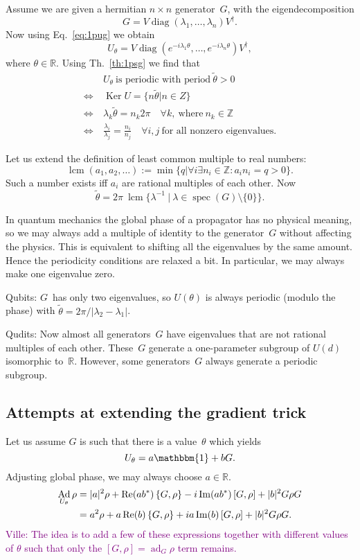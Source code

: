 \documentclass[aps,pra,10pt,twocolumn,groupedaddress,nofootinbib]{revtex4-1}
\theoremstyle{plain}
\DeclareMathOperator{\re}{Re}
\DeclareMathOperator{\im}{Im}
\DeclareMathOperator{\Ad}{Ad}
\DeclareMathOperator{\ad}{ad}
\DeclareMathOperator{\diag}{diag}  %
\DeclareMathOperator{\Ker}{Ker}    %
\DeclareMathOperator{\spec}{spec}  %
\DeclareMathOperator{\lcm}{lcm}    %
\newcommand{\be}{\begin{equation}}
\newcommand{\ee}{\end{equation}}
\newcommand{\Z}{\ensuremath{\mathbb Z}}  %
\newcommand{\R}{\ensuremath{\mathbb R}}  %
\newcommand{\I}{\mathbbm{1}} %
\newcommand{\comm}[2]{\ensuremath{\left[#1, #2\right]}}             %
\newcommand{\acomm}[2]{\ensuremath{\left\{#1, #2\right\}}}          %
\newcommand{\ville}[1]{\textcolor{purple}{Ville: #1}}
\begin{document}
Assume we are given a hermitian $n \times n$ generator~$G$, with the eigendecomposition
\be
G = V \diag(\lambda_1, \ldots, \lambda_n) V^\dagger.
\ee
Now using Eq.~\eqref{eq:1pug} we obtain
\be
U_\theta
= V \diag(e^{-i\lambda_1 \theta}, \ldots, e^{-i\lambda_n \theta}) V^\dagger,
\ee
where $\theta \in \R$. Using Th.~\ref{th:1psg} we find that
\begin{align}
  & U_\theta \: \text{is periodic with period} \: \tilde{\theta} > 0\\
  \iff \: & \Ker U = \{n \tilde{\theta} | n \in Z\}\\
  \iff \: & \lambda_k \tilde{\theta} = n_k 2 \pi \quad \forall k, \: \text{where} \: n_k \in \Z\\
  \iff \: & \frac{\lambda_i}{\lambda_j} = \frac{n_i}{n_j} \quad \forall i,j
  \: \text{for all nonzero eigenvalues.}
\end{align}

Let us extend the definition of least common multiple to real numbers:
\be
\lcm(a_1, a_2, \ldots) := \min \{q | \forall i \exists n_i \in \Z: a_i n_i = q>0\}.
\ee
Such a number exists iff $a_i$ are rational multiples of each other.
Now
\be
\tilde{\theta} = 2\pi \: \lcm \{\lambda^{-1} \:|\: \lambda \in \spec(G) \setminus \{0\}\}.
\ee

In quantum mechanics the global phase of a propagator has no physical meaning, so we may always add
a multiple of identity to the generator~$G$ without affecting the physics.
This is equivalent to shifting all the eigenvalues by the same amount.
Hence the periodicity conditions are relaxed a bit. In particular, we may always make one eigenvalue zero.


Qubits:
$G$~has only two eigenvalues, so $U(\theta)$ is always periodic (modulo the phase)
with $\tilde{\theta} = 2\pi/|\lambda_2-\lambda_1|$.

Qudits:
Now almost all generators~$G$ have eigenvalues that are not rational multiples of each other.
These~$G$ generate a one-parameter subgroup of $U(d)$ isomorphic to~$\R$.
However, some generators~$G$ always generate a periodic subgroup.


\subsection{Attempts at extending the gradient trick}

Let us assume $G$ is such that there is a value~$\theta$ which yields
\be
\label{eq:U_IG}
U_\theta = a\I +bG.
\ee
Adjusting global phase, we may always choose $a \in \R$.
\begin{align}
\label{eq:AdUtheta}
\notag
\Ad_{U_\theta} \rho &=
|a|^2 \rho +\re(ab^*)\acomm{G}{\rho}
-i\im(ab^*)\comm{G}{\rho} +|b|^2 G\rho G\\
&=
a^2 \rho +a\re(b)\acomm{G}{\rho}
+ia\im(b)\comm{G}{\rho} +|b|^2 G\rho G.
\end{align}
\ville{The idea is to add a few of these expressions together with different values of $\theta$
such that only the $\comm{G}{\rho} = \ad_G \rho$ term remains.}
\end{document}
